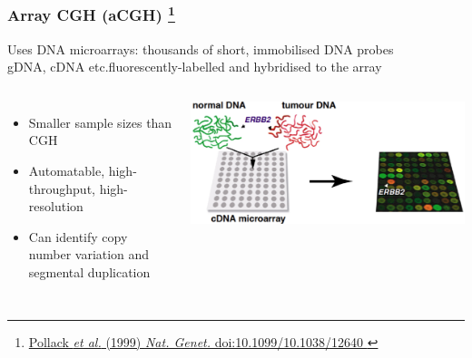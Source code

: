 %
\begin{frame}
  \frametitle{Array CGH (aCGH)
  \footnote{\tiny{\href{http://dx.doi.org/10.1038/12640
}{Pollack \textit{et al.} (1999) \textit{Nat. Genet.} doi:10.1099/10.1038/12640
}}}
  }
  Uses DNA microarrays: thousands of short, immobilised DNA probes \\
  gDNA, cDNA etc.\textcolor{RawSienna}{fluorescently}-\textcolor{hutton_green}{labelled} and hybridised to the array\\
  \begin{columns}[c] 
      \begin{itemize}
        \item Smaller sample sizes than CGH
        \item \textcolor{hutton_blue}{Automatable, high-throughput, high-resolution}
        \item \textcolor{hutton_purple}{Can identify copy number variation and segmental duplication}
      \end{itemize}
      \includegraphics[width=\textwidth]{images/array_cgh}
  \end{columns}   
\end{frame}